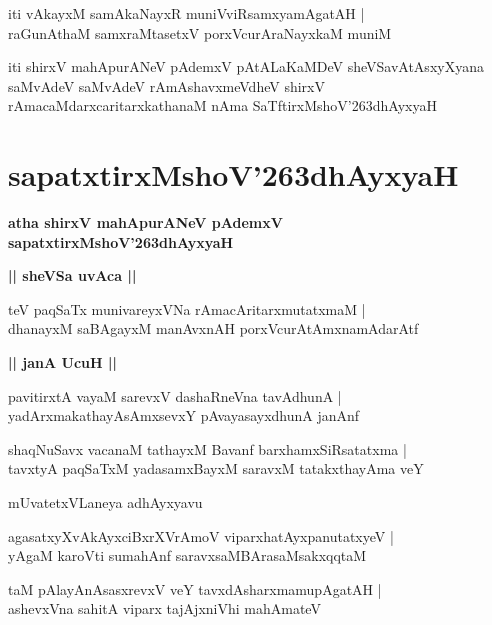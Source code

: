 \documentclass[twoside,12pt,openright]{book}
\def\S{\char'263}
\newcounter{shloka}[chapter]
\def\uvaca#1{\centerline{{\large\textbf{#1}}}}
\begin{document}
\begin{shloka}%
iti vAkayxM samAkaNayxR muniVviRsamxyamAgatAH |\\
raGunAthaM samxraMtasetxV porxVcurAraNayxkaM muniM 
\end{shloka}

\begin{center}
iti shirxV mahApurANeV pAdemxV pAtALaKaMDeV sheVSavAtAsxyXyana saMvAdeV 
saMvAdeV rAmAshavxmeVdheV shirxV rAmacaMdarxcaritarxkathanaM nAma SaTftirxMshoV\S dhAyxyaH
\end{center}

\chapter{sapatxtirxMshoV\S dhAyxyaH}

\begin{center}
{\LARGE\bfseries atha shirxV mahApurANeV pAdemxV sapatxtirxMshoV\S dhAyxyaH}
\end{center}

\uvaca{|| sheVSa uvAca ||}

\begin{shloka}%
teV paqSaTx munivareyxVNa rAmacAritarxmutatxmaM |\\
dhanayxM saBAgayxM manAvxnAH porxVcurAtAmxnamAdarAtf 
\end{shloka}

\uvaca{|| janA UcuH ||}

\begin{shloka}%
pavitirxtA vayaM sarevxV dashaRneVna tavAdhunA |\\
yadArxmakathayAsAmxsevxY pAvayasayxdhunA janAnf 
\end{shloka}

\begin{shloka}%
shaqNuSavx vacanaM tathayxM Bavanf barxhamxSiRsatatxma |\\
tavxtyA paqSaTxM yadasamxBayxM saravxM tatakxthayAma veY 
\end{shloka}

\begin{center}
mUvatetxVLaneya adhAyxyavu
\end{center}

\begin{shloka}%
agasatxyXvAkAyxciBxrXVrAmoV viparxhatAyxpanutatxyeV |\\
yAgaM karoVti sumahAnf saravxsaMBArasaMsakxqqtaM 
\end{shloka}

\begin{shloka}%
taM pAlayAnAsasxrevxV veY tavxdAsharxmamupAgatAH |\\
ashevxVna sahitA viparx tajAjxniVhi mahAmateV 
\end{shloka}
\end{document}
